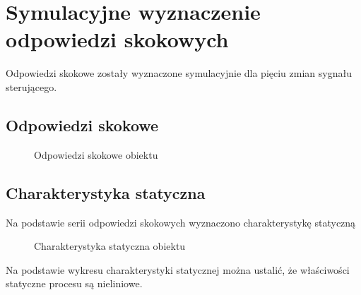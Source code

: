 \section{Symulacyjne wyznaczenie odpowiedzi skokowych}
\label{projekt:zad2}

Odpowiedzi skokowe zostały wyznaczone
symulacyjnie dla pięciu zmian sygnału sterującego.

\subsection{Odpowiedzi skokowe}
\label{projekt:zad2:odpSkok}

\begin{figure}[H] 
    \centering
    
    \caption{Odpowiedzi skokowe obiektu}
    \label{projekt:zad2:odpSkok:figure}
\end{figure}

\newpage

\subsection{Charakterystyka statyczna}
\label{projekt:zad2:charStat}

Na podstawie serii odpowiedzi skokowych wyznaczono charakterystykę statyczną

\begin{figure}[H] 
    \centering
    
    \caption{Charakterystyka statyczna obiektu}
    \label{projekt:zad2:charStat:figure}
\end{figure}

Na podstawie wykresu charakterystyki statycznej można ustalić, 
że właściwości statyczne procesu są nieliniowe. \newline

\newpage
